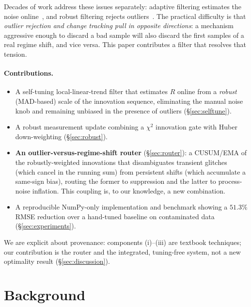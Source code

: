 \documentclass[10pt,twocolumn]{article}
\newcommand{\Rmeas}{R}
\begin{document}
Decades of work address these issues separately: adaptive filtering estimates
the noise online~\cite{mehra1970,zhang2020}, and robust filtering rejects
outliers~\cite{huber1964,wang2018}. The practical difficulty is that
\emph{outlier rejection and change tracking pull in opposite directions}: a
mechanism aggressive enough to discard a bad sample will also discard the first
samples of a real regime shift, and vice versa. This paper contributes a filter
that resolves that tension.

\paragraph{Contributions.}
\begin{itemize}
\item A self-tuning local-linear-trend filter that estimates $\Rmeas$ online from
a \emph{robust} (MAD-based) scale of the innovation sequence, eliminating the
manual noise knob and remaining unbiased in the presence of outliers
(\S\ref{sec:selftune}).
\item A robust measurement update combining a $\chi^2$ innovation gate with
Huber down-weighting (\S\ref{sec:robust}).
\item \textbf{An outlier-versus-regime-shift router} (\S\ref{sec:router}): a
CUSUM/EMA of the robustly-weighted innovations that disambiguates transient
glitches (which cancel in the running sum) from persistent shifts (which
accumulate a same-sign bias), routing the former to suppression and the latter
to process-noise inflation. This coupling is, to our knowledge, a new
combination.
\item A reproducible NumPy-only implementation and benchmark showing a $51.3\%$
RMSE reduction over a hand-tuned baseline on contaminated data
(\S\ref{sec:experiments}).
\end{itemize}

We are explicit about provenance: components (i)--(iii) are textbook techniques;
our contribution is the router and the integrated, tuning-free system, not a new
optimality result (\S\ref{sec:discussion}).

\section{Background}
\end{document}
